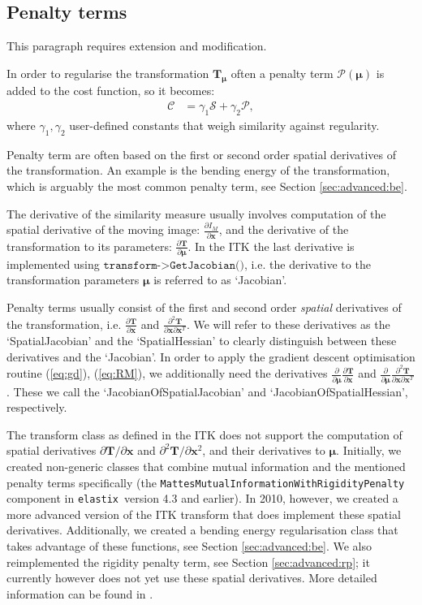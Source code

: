 \documentclass[]{report}
\newcommand{\elastix}{\texttt{elastix}}
\newcommand{\vx}{\bm{x}}
\newcommand{\vmu}{\bm{\mu}}
\newcommand{\vT}{\bm{T}}
\newcommand{\D}[2]{\frac{\partial #1}{\partial #2}}
\newcommand{\Dd}[3]{\frac{\partial^2 #1}{\partial #2 \partial #3}}
\begin{document}
\subsection{Penalty terms}\label{sec:penaltyterms}

This paragraph requires extension and modification.

In order to regularise the transformation $\vT_{\vmu}$ often a
penalty term $\mathcal{P}(\vmu)$ is added to the cost function, so
it becomes:
\begin{align}
\mathcal{C} &= \gamma_1 \mathcal{S} + \gamma_2 \mathcal{P},
\end{align}
where $\gamma_1, \gamma_2$ user-defined constants that weigh
similarity against regularity.

Penalty term are often based on the first or second order spatial
derivatives of the transformation. An example is the bending energy
of the transformation, which is arguably the most common penalty
term, see Section \ref{sec:advanced:be}.

The derivative of the similarity measure usually involves
computation of the spatial derivative of the moving image:
$\D{I_M}{\vx}$, and the derivative of the transformation to its
parameters: $\D{\vT}{\vmu}$. In the ITK the last derivative is
implemented using $\texttt{transform->GetJacobian()}$, i.e. the
derivative to the transformation parameters $\vmu$ is referred to as
`Jacobian'.

Penalty terms usually consist of the first and second order
\emph{spatial} derivatives of the transformation, i.e.
$\D{\vT}{\vx}$ and $\Dd{\vT}{\vx}{\vx^T}$. We will refer to these
derivatives as the `SpatialJacobian' and the `SpatialHessian' to
clearly distinguish between these derivatives and the `Jacobian'. In
order to apply the gradient descent optimisation routine
(\ref{eq:gd}), (\ref{eq:RM}), we additionally need the derivatives
$\D{}{\vmu} \D{\vT}{\vx}$ and $\D{}{\vmu} \Dd{\vT}{\vx}{\vx^T}$.
These we call the `JacobianOfSpatialJacobian' and
`JacobianOfSpatialHessian', respectively.

The transform class as defined in the ITK does not support the computation of
spatial derivatives $\partial \vT / \partial \vx$ and $\partial^2 \vT /
\partial \vx^2$, and their derivatives to $\vmu$. Initially, we created
non-generic classes that combine mutual information and the
mentioned penalty terms specifically (the
\texttt{MattesMutualInformationWithRigidityPenalty} component in
\elastix\ version 4.3 and earlier). In 2010, however, we created a
more advanced version of the ITK transform that does implement these
spatial derivatives. Additionally, we created a bending energy
regularisation class that takes advantage of these functions, see
Section \ref{sec:advanced:be}. We also reimplemented the rigidity
penalty term, see Section \ref{sec:advanced:rp}; it currently
however does not yet use these spatial derivatives. More detailed
information can be found in \cite{StaringKlein2010a}.
\end{document}
